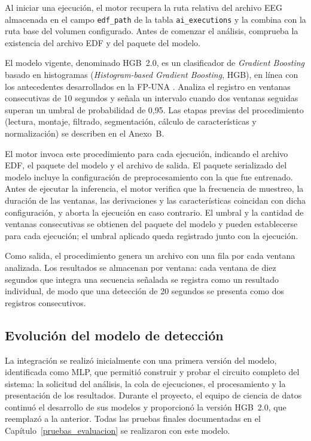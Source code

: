 Al iniciar una ejecución, el motor recupera la ruta relativa del archivo EEG almacenada en el campo \texttt{edf\_path} de la tabla \texttt{ai\_executions} y la combina con la ruta base del volumen configurado.
Antes de comenzar el análisis, comprueba la existencia del archivo EDF y del paquete del modelo.

\begin{nuevotextodos}
El modelo vigente, denominado HGB~2.0, es un clasificador de \textit{Gradient Boosting} basado en histogramas (\textit{Histogram-based Gradient Boosting}, HGB), en línea con los antecedentes desarrollados en la FP-UNA \citep{Lezcano2026GradientBoosting}.
Analiza el registro en ventanas consecutivas de 10 segundos y señala un intervalo cuando dos ventanas seguidas superan un umbral de probabilidad de 0,95.
Las etapas previas del procedimiento (lectura, montaje, filtrado, segmentación, cálculo de características y normalización) se describen en el Anexo~B.
\end{nuevotextodos}

El motor invoca este procedimiento para cada ejecución, indicando el archivo EDF, el paquete del modelo y el archivo de salida.
El paquete serializado del modelo incluye la configuración de preprocesamiento con la que fue entrenado.
Antes de ejecutar la inferencia, el motor verifica que la frecuencia de muestreo, la duración de las ventanas, las derivaciones y las características coincidan con dicha configuración, y aborta la ejecución en caso contrario.
El umbral y la cantidad de ventanas consecutivas se obtienen del paquete del modelo y pueden establecerse para cada ejecución; el umbral aplicado queda registrado junto con la ejecución.

Como salida, el procedimiento genera un archivo con una fila por cada ventana analizada.
Los resultados se almacenan por ventana: cada ventana de diez segundos que integra una secuencia señalada se registra como un resultado individual, de modo que una detección de 20 segundos se presenta como dos registros consecutivos.

\subsection{Evolución del modelo de detección}
\label{subsec:evolucion-modelo}

La integración se realizó inicialmente con una primera versión del modelo, identificada como MLP, que permitió construir y probar el circuito completo del sistema: la solicitud del análisis, la cola de ejecuciones, el procesamiento y la presentación de los resultados.
Durante el proyecto, el equipo de ciencia de datos continuó el desarrollo de sus modelos y proporcionó la versión HGB~2.0, que reemplazó a la anterior.
Todas las pruebas finales documentadas en el Capítulo~\ref{pruebas_evaluacion} se realizaron con este modelo.

